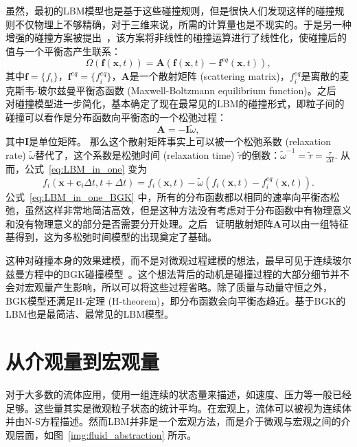 虽然，最初的LBM模型也是基于这些碰撞规则，但是很快人们发现这样的碰撞规则不仅物理上不够精确，对于三维来说，所需的计算量也是不现实的。于是另一种增强的碰撞方案被提出~\citep{higuera1989lattice, higuera1989boltzmann}，该方案将非线性的碰撞运算进行了线性化，使碰撞后的值与一个平衡态产生联系：
\begin{equation}
    \Omega(\mathbf{f}(\mathbf{x},t))=\mathbf{A}(\mathbf{f}(\mathbf{x},t)-\mathbf{f}^{eq}(\mathbf{x},t)),
\end{equation}
其中$\mathbf{f}=\{f_i\}$，$\mathbf{f}^{eq}=\{f_{i}^{eq}\}$，$\mathbf{A}$是一个散射矩阵 (scattering matrix)，$f_{i}^{eq}$是离散的麦克斯韦-玻尔兹曼平衡态函数 (Maxwell-Boltzmann equilibrium function)。之后~\citet{qian1992lattice} 对碰撞模型进一步简化，基本确定了现在最常见的LBM的碰撞形式，即粒子间的碰撞可以看作是分布函数向平衡态的一个松弛过程：
\begin{equation}
    \mathbf{A}=-\mathbf{I}\tilde{\omega},
\end{equation}
其中$\mathbf{I}$是单位矩阵。
那么这个散射矩阵事实上可以被一个松弛系数 (relaxation rate) $\tilde{\omega}$替代了，这个系数是松弛时间 (relaxation time) $\tilde{\tau}$的倒数：$\tilde{\omega}^{-1}=\tilde{\tau}=\frac{\tau}{\Delta t}$. 从而，公式~\ref{eq:LBM_in_one} 变为
\begin{equation}
    f_{i}(\mathbf{x}+\mathbf{c}_i \Delta t,t+\Delta t)=f_{i}(\mathbf{x},t)-\tilde{\omega}(f_{i}(\mathbf{x},t)-f_{i}^{eq}(\mathbf{x},t)).
    \label{eq:LBM_in_one_BGK}
\end{equation}
公式~\ref{eq:LBM_in_one_BGK} 中，所有的分布函数都以相同的速率向平衡态松弛，虽然这样非常地简洁高效，但是这种方法没有考虑对于分布函数中有物理意义和没有物理意义的部分是否需要分开处理。之后~\citet{dHumieres-1992} 证明散射矩阵$\mathbf{A}$可以由一组特征基得到，这为多松弛时间模型的出现奠定了基础。

这种对碰撞本身的效果建模，而不是对微观过程建模的想法，最早可见于连续玻尔兹曼方程中的BGK碰撞模型~\citep{Bhatnagar-1954}。这个想法背后的动机是碰撞过程的大部分细节并不会对宏观量产生影响，所以可以将这些过程省略。除了质量与动量守恒之外，BGK模型还满足$\mathrm{H}$-定理 (H-theorem)，即分布函数会向平衡态趋近。基于BGK的LBM也是最简洁、最常见的LBM模型。


\section{从介观量到宏观量}
\label{sec:moment}
对于大多数的流体应用，使用一组连续的状态量来描述，如速度、压力等一般已经足够。这些量其实是微观粒子状态的统计平均。在宏观上，流体可以被视为连续体并由N-S方程描述。然而LBM并非是一个宏观方法，而是介于微观与宏观之间的介观层面，如图~\ref{img:fluid_abstraction} 所示。

